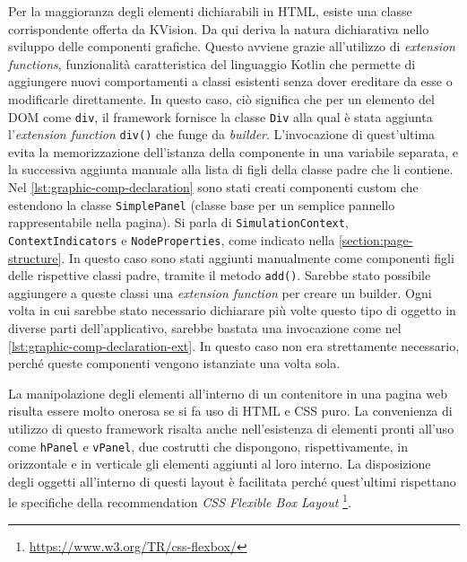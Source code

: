 Per la maggioranza degli elementi dichiarabili in HTML, esiste una classe corrispondente offerta da KVision. Da qui deriva la natura dichiarativa nello sviluppo delle componenti grafiche. Questo avviene grazie all'utilizzo di \textit{extension functions}, funzionalità caratteristica del linguaggio Kotlin che permette di aggiungere nuovi comportamenti a classi esistenti senza dover ereditare da esse o modificarle direttamente. In questo caso, ciò significa che per un elemento del \ac{DOM} come \texttt{div}, il framework fornisce la classe \texttt{Div} alla qual è stata aggiunta l'\textit{extension function} \texttt{div()} che funge da \textit{builder}. L'invocazione di quest'ultima evita la memorizzazione dell'istanza della componente in una variabile separata, e la successiva aggiunta manuale alla lista di figli della classe padre che li contiene.
Nel \cref{lst:graphic-comp-declaration} sono stati creati componenti custom che estendono la classe \texttt{SimplePanel} (classe base per un semplice pannello rappresentabile nella pagina). Si parla di \texttt{SimulationContext}, \texttt{ContextIndicators} e \texttt{NodeProperties}, come indicato nella \cref{section:page-structure}. In questo caso sono stati aggiunti manualmente come componenti figli delle rispettive classi padre, tramite il metodo \texttt{add()}. Sarebbe stato possibile aggiungere a queste classi una \textit{extension function} per creare un builder. Ogni volta in cui sarebbe stato necessario dichiarare più volte questo tipo di oggetto in diverse parti dell'applicativo, sarebbe bastata una invocazione come nel \cref{lst:graphic-comp-declaration-ext}. In questo caso non era strettamente necessario, perché queste componenti vengono istanziate una volta sola.



La manipolazione degli elementi all'interno di un contenitore in una pagina web risulta essere molto onerosa se si fa uso di HTML e CSS puro. La convenienza di utilizzo di questo framework risalta anche nell'esistenza di elementi pronti all'uso come \texttt{hPanel} e \texttt{vPanel}, due costrutti che dispongono, rispettivamente, in orizzontale e in verticale gli elementi aggiunti al loro interno. La disposizione degli oggetti all'interno di questi layout è facilitata perché quest'ultimi rispettano le specifiche della recommendation \textit{CSS Flexible Box Layout} \footnote{\url{https://www.w3.org/TR/css-flexbox/}}.

